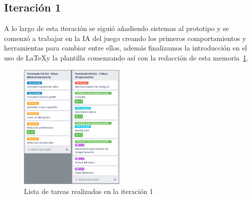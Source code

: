 \subsection{Iteración 1}
A lo largo de esta iteración se siguió añadiendo sistemas al prototipo y se comenzó a
trabajar en la \ac{IA} del juego creando los primeros comportamientos y herramientas
para cambiar entre ellos, además finalizamos la introducción en el uso de \LaTeX y la
plantilla comenzando así con la redacción de esta memoria~\ref{img:it_1}.

\begin{figure}[ht]
\centering
\includegraphics[width=0.45\textwidth]{imagenes/metodologia/tareas_it1.png}
\caption{Lista de tareas realizadas en la iteración 1}
\label{img:it_1}
\end{figure}


